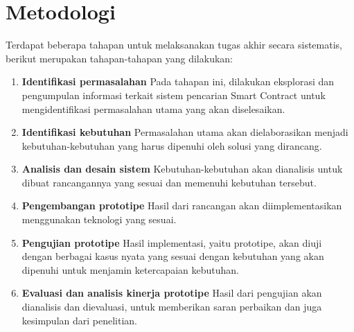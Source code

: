 \section{Metodologi}
\label{sec:metodologi}


Terdapat beberapa tahapan untuk melaksanakan tugas akhir secara sistematis, berikut merupakan tahapan-tahapan yang dilakukan:

\begin{enumerate}
  \item \textbf{Identifikasi permasalahan} \newline
        Pada tahapan ini, dilakukan eksplorasi dan pengumpulan informasi terkait sistem pencarian Smart Contract untuk mengidentifikasi permasalahan utama yang akan diselesaikan.
  \item \textbf{Identifikasi kebutuhan} \newline
        Permasalahan utama akan dielaborasikan menjadi kebutuhan-kebutuhan yang harus dipenuhi oleh solusi yang dirancang.
  \item \textbf{Analisis dan desain sistem} \newline
        Kebutuhan-kebutuhan akan dianalisis untuk dibuat rancangannya yang sesuai dan memenuhi kebutuhan tersebut.
  \item \textbf{Pengembangan prototipe} \newline
        Hasil dari rancangan akan diimplementasikan menggunakan teknologi yang sesuai.
  \item \textbf{Pengujian prototipe} \newline
        Hasil implementasi, yaitu prototipe, akan diuji dengan berbagai kasus nyata yang sesuai dengan kebutuhan yang akan dipenuhi untuk menjamin ketercapaian kebutuhan.
  \item \textbf{Evaluasi dan analisis kinerja prototipe} \newline
        Hasil dari pengujian akan dianalisis dan dievaluasi, untuk memberikan saran perbaikan dan juga kesimpulan dari penelitian.
\end{enumerate}



